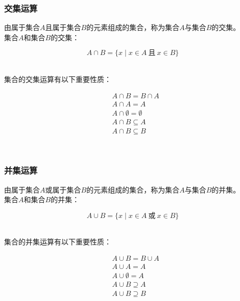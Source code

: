 \documentclass[UTF8]{ctexart}
\begin{document}
\newpage

\subsubsection{交集运算}
    由属于集合$A$且属于集合$B$的元素组成的集合，称为集合$A$与集合$B$的交集。\\[3mm]
    集合$A$和集合$B$的交集：
    \begin{large}
        \begin{equation*}
            A\cap B=\big\{ x\mid x\in A~\text{且}~x\in B\big\}
        \end{equation*}
    \end{large}\\
    集合的交集运算有以下重要性质：
    \begin{large}
        \begin{align*}
            &A\cap B=B\cap A\\[3mm]
            &A\cap A=A\\[3mm]
            &A\cap \emptyset=\emptyset\\[3mm]
            &A\cap B\subseteq A\\[3mm]
            &A\cap B\subseteq B
        \end{align*}
    \end{large}\\

\subsubsection{并集运算}
    由属于集合$A$或属于集合$B$的元素组成的集合，称为集合$A$与集合$B$的并集。\\[3mm]
    集合$A$和集合$B$的并集：
    \begin{large}
        \begin{equation*}
            A\cup B=\big\{ x\mid x\in A~\text{或}~x\in B\big\}
        \end{equation*}
    \end{large}\\
    集合的并集运算有以下重要性质：
    \begin{large}
        \begin{align*}
            &A\cup B=B\cup A\\[3mm]
            &A\cup A=A\\[3mm]
            &A\cup \emptyset=A\\[3mm]
            &A\cup B\supseteq A\\[3mm]
            &A\cup B\supseteq B
        \end{align*}
    \end{large}\\
\end{document}
